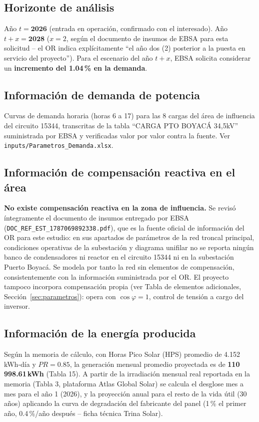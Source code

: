\documentclass[11pt,a4paper]{article}
\begin{document}
\subsection{Horizonte de an\'alisis}
\label{sec:parametros-t}
A\~no $t = \mathbf{2026}$ (entrada en operaci\'on, confirmado con el interesado). A\~no $t+x = \mathbf{2028}$ ($x=2$, seg\'un el documento de insumos de EBSA para esta solicitud -- el OR indica expl\'icitamente ``el a\~no dos (2) posterior a la puesta en servicio del proyecto''). Para el escenario del a\~no $t+x$, EBSA solicita considerar un \textbf{incremento del 1.04\,\% en la demanda}.

\subsection{Informaci\'on de demanda de potencia}
Curvas de demanda horaria (horas 6 a 17) para las 8 cargas del \'area de influencia del circuito 15344, transcritas de la tabla ``CARGA PTO BOYAC\'A 34,5kV'' suministrada por EBSA y verificadas valor por valor contra la fuente. Ver \texttt{inputs/Parametros\_Demanda.xlsx}.

\subsection{Informaci\'on de compensaci\'on reactiva en el \'area}
\textbf{No existe compensaci\'on reactiva en la zona de influencia.} Se revis\'o \'integramente el documento de insumos entregado por EBSA (\texttt{DOC\_REF\_EST\_1787069892338.pdf}), que es la fuente oficial de informaci\'on del OR para este estudio: en sus apartados de par\'ametros de la red troncal principal, condiciones operativas de la subestaci\'on y diagrama unifilar no se reporta ning\'un banco de condensadores ni reactor en el circuito 15344 ni en la subestaci\'on Puerto Boyac\'a. Se modela por tanto la red sin elementos de compensaci\'on, consistentemente con la informaci\'on suministrada por el OR. El proyecto tampoco incorpora compensaci\'on propia (ver Tabla de elementos adicionales, Secci\'on~\ref{sec:parametros}): opera con $\cos\varphi = 1$, control de tensi\'on a cargo del inversor.

\subsection{Informaci\'on de la energ\'ia producida}
Seg\'un la memoria de c\'alculo, con Horas Pico Solar (HPS) promedio de 4.152\,kWh-d\'ia y $PR=0.85$, la generaci\'on mensual promedio proyectada es de \textbf{110\,998.61\,kWh} (Tabla 15). A partir de la irradiaci\'on mensual real reportada en la memoria (Tabla 3, plataforma Atlas Global Solar) se calcula el desglose mes a mes para el a\~no 1 (2026), y la proyecci\'on anual para el resto de la vida \'util (30 a\~nos) aplicando la curva de degradaci\'on del fabricante del panel (1\,\% el primer a\~no, 0.4\,\%/a\~no despu\'es -- ficha t\'ecnica Trina Solar).
\end{document}
